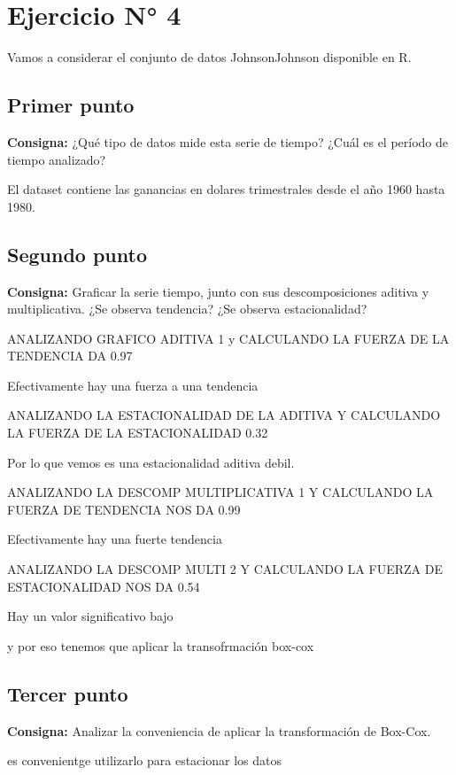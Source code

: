 \documentclass{article} %
\begin{document}
\section{Ejercicio N° 4}

Vamos a considerar el conjunto de datos JohnsonJohnson disponible en R.

\subsection{Primer punto}

\textbf{Consigna:} ¿Qué tipo de datos mide esta serie de tiempo? ¿Cuál es el período de tiempo analizado?

El dataset contiene las ganancias en dolares trimestrales desde el año 1960 hasta 1980.

\subsection{Segundo punto}

\textbf{Consigna:} Graficar la serie tiempo, junto con sus descomposiciones aditiva y multiplicativa. ¿Se observa tendencia? ¿Se observa estacionalidad?

ANALIZANDO GRAFICO ADITIVA 1 y CALCULANDO LA FUERZA DE LA TENDENCIA DA 0.97

Efectivamente hay una fuerza a una tendencia

ANALIZANDO LA ESTACIONALIDAD DE LA ADITIVA Y CALCULANDO LA FUERZA DE LA ESTACIONALIDAD 0.32

Por lo que vemos es una estacionalidad aditiva debil.

ANALIZANDO LA DESCOMP MULTIPLICATIVA 1 Y CALCULANDO LA FUERZA DE TENDENCIA NOS DA 0.99

Efectivamente hay una fuerte tendencia

ANALIZANDO LA DESCOMP MULTI 2 Y CALCULANDO LA FUERZA DE ESTACIONALIDAD NOS DA 0.54

Hay un valor significativo bajo

y por eso tenemos que aplicar la transofrmación box-cox

\subsection{Tercer punto}

\textbf{Consigna:} Analizar la conveniencia de aplicar la transformación de Box-Cox.

es convenientge utilizarlo para estacionar los datos
\end{document}
